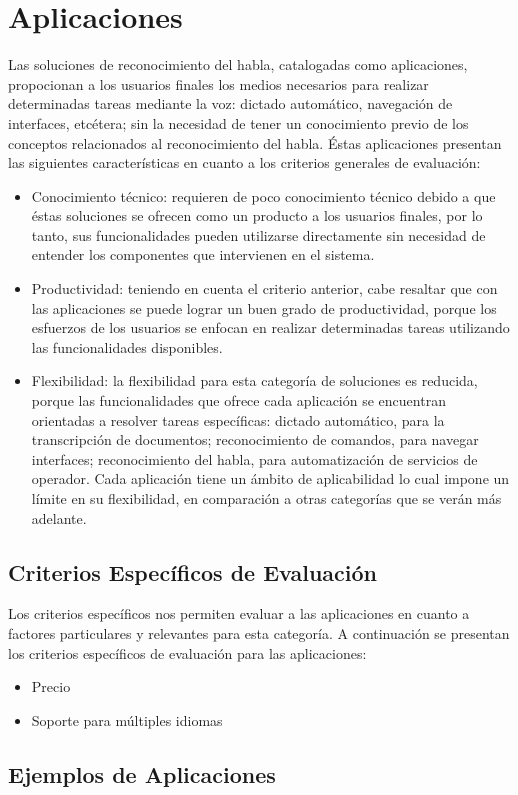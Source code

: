 \section{Aplicaciones}
\label{sec:aplicaciones}


Las soluciones de reconocimiento del habla, catalogadas como aplicaciones, propocionan
a los usuarios finales los medios necesarios para realizar determinadas tareas mediante
la voz: dictado autom\'atico, navegaci\'on de interfaces, etc\'etera; sin
la necesidad de tener un conocimiento previo de los conceptos relacionados al
reconocimiento del habla. \'Estas aplicaciones presentan las siguientes 
caracter\'isticas en cuanto a los criterios generales de evaluaci\'on:

\begin{itemize}
    \item Conocimiento t\'ecnico: requieren de poco conocimiento t\'ecnico debido a que \'estas
        soluciones se ofrecen como un producto a los usuarios finales, por lo tanto, sus funcionalidades
        pueden utilizarse directamente sin necesidad de entender los componentes que intervienen
         en el sistema.
    \item Productividad: teniendo en cuenta el criterio anterior, cabe resaltar que con
        las aplicaciones se puede lograr un buen grado de productividad, porque los esfuerzos
        de los usuarios se enfocan en realizar determinadas tareas utilizando las funcionalidades
         disponibles.
    \item Flexibilidad: la flexibilidad para esta categor\'ia de soluciones es reducida, porque las
        funcionalidades que ofrece cada aplicaci\'on se encuentran orientadas a resolver tareas
        espec\'ificas: dictado autom\'atico, para la transcripci\'on de documentos; reconocimiento
        de comandos, para navegar interfaces; reconocimiento del habla, para 
        automatizaci\'on de servicios de operador. Cada aplicaci\'on tiene un \'ambito de aplicabilidad
        lo cual impone un l\'imite en su flexibilidad, en comparaci\'on a otras categor\'ias que
         se ver\'an m\'as adelante.
\end{itemize}

\subsection{Criterios Espec\'ificos de Evaluaci\'on}

Los criterios espec\'ificos nos permiten evaluar a las aplicaciones en cuanto a factores
particulares y relevantes para esta categor\'ia. A continuaci\'on se presentan los criterios 
espec\'ificos de evaluaci\'on para las aplicaciones:

\begin{itemize}
    \item Precio
    \item Soporte para m\'ultiples idiomas
\end{itemize}

\subsection{Ejemplos de Aplicaciones}




